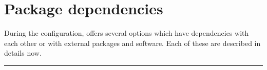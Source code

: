 \chapter{Package dependencies}\label{app:package-dependencies}

During the configuration,  offers several \akantu options which have
dependencies with each other or with external packages and software.  Each of
these are described in details now.
\vspace*{1ex}
\hrule
\vspace*{1ex}


